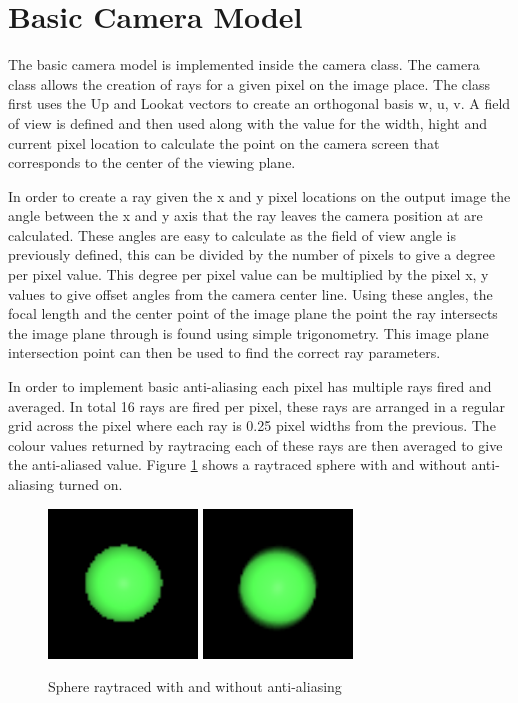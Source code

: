 \documentclass{article}
\begin{document}
\section{Basic Camera Model}

The basic camera model is implemented inside the camera class. The camera class
allows the creation of rays for a given pixel on the image place. The class first uses the Up and
Lookat vectors to create an orthogonal basis w, u, v. A field of view is defined
and then used along with the value for the width, hight and current pixel location
to calculate the point on the camera screen that corresponds to the center of the
viewing plane.

In order to create a ray given the x and y pixel locations on the output image
the angle between the x and y axis that the ray leaves the camera position at are
calculated. These angles are easy to calculate as the field of view angle is
previously defined, this can be divided by the number of pixels to give a degree
per pixel value. This degree per pixel value can be multiplied by the pixel x, y
values to give offset angles from the camera center line. Using these angles,
the focal length and the center point of the image
plane the point the ray intersects the image plane through is found using simple
trigonometry. This image plane intersection
point can then be used to find the correct ray parameters.

In order to implement basic anti-aliasing each pixel has multiple rays fired and
averaged. In total 16 rays are fired per pixel, these rays are arranged in a regular grid across the pixel where each
ray is 0.25 pixel widths from the previous.
The colour values returned by raytracing each of these rays are then averaged to give the anti-aliased
value. Figure \ref{fig:antialias} shows a raytraced sphere with and without anti-aliasing
turned on.\\

\begin{figure}[H]
  \begin{center}
  \includegraphics[width=150px]{Images/antialiasOff.png}
  \includegraphics[width=150px]{Images/antialiasOn.png}
  \caption{Sphere raytraced with and without anti-aliasing}
  \label{fig:antialias}
  \end{center}
\end{figure}
\end{document}
